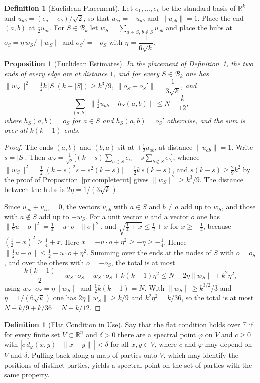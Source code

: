 \documentclass[11pt,letterpaper]{report}
\theoremstyle{plain}
\newtheorem{proposition}[theorem]{Proposition}
\theoremstyle{definition}
\newtheorem{definition}[theorem]{Definition}
\theoremstyle{remark}
\begin{document}
\begin{definition}[Euclidean Placement]\label{def:placement}
Let $e_1,\ldots,e_k$ be the standard basis of $\mathbb R^k$ and $u_{ab}=(e_a-e_b)/\sqrt2$, so that $u_{ba}=-u_{ab}$ and $\|u_{ab}\|=1$. Place the end $(a,b)$ at $\tfrac12u_{ab}$. For $S\in\mathcal B_k$ let $w_S=\sum_{a\in S,\,b\notin S}u_{ab}$ and place the hubs at $o_S=\eta\,w_S/\|w_S\|$ and $o_S'=-o_S$ with $\eta=\dfrac1{6\sqrt k}$.
\end{definition}

\begin{proposition}[Euclidean Estimates]\label{pr:euclid}
In the placement of Definition~\ref{def:placement}, the two ends of every edge are at distance $1$, and for every $S\in\mathcal B_k$ one has $\|w_S\|^2=\tfrac12k\,|S|(k-|S|)\ge k^3/9$, $\|o_S-o_S'\|=\dfrac1{3\sqrt k}$, and
\[
\sum_{(a,b)}\bigl\|\tfrac12u_{ab}-h_S(a,b)\bigr\|\le N-\frac k{12},
\]
where $h_S(a,b)=o_S$ for $a\in S$ and $h_S(a,b)=o_S'$ otherwise, and the sum is over all $k(k-1)$ ends.
\end{proposition}
\begin{proof}
The ends $(a,b)$ and $(b,a)$ sit at $\pm\tfrac12u_{ab}$, at distance $\|u_{ab}\|=1$. Write $s=|S|$. Then $w_S=\tfrac1{\sqrt2}\bigl[(k-s)\sum_{a\in S}e_a-s\sum_{b\notin S}e_b\bigr]$, whence $\|w_S\|^2=\tfrac12\bigl[(k-s)^2s+s^2(k-s)\bigr]=\tfrac12k\,s(k-s)$, and $s(k-s)\ge\tfrac29k^2$ by the proof of Proposition~\ref{pr:completecut} gives $\|w_S\|^2\ge k^3/9$. The distance between the hubs is $2\eta=1/(3\sqrt k)$.

Since $u_{ab}+u_{ba}=0$, the vectors $u_{ab}$ with $a\in S$ and $b\ne a$ add up to $w_S$, and those with $a\notin S$ add up to $-w_S$. For a unit vector $u$ and a vector $o$ one has $\|\tfrac12u-o\|^2=\tfrac14-u\cdot o+\|o\|^2$, and $\sqrt{\tfrac14+x}\le\tfrac12+x$ for $x\ge-\tfrac14$, because $(\tfrac12+x)^2\ge\tfrac14+x$. Here $x=-u\cdot o+\eta^2\ge-\eta\ge-\tfrac14$. Hence $\|\tfrac12u-o\|\le\tfrac12-u\cdot o+\eta^2$. Summing over the ends at the nodes of $S$ with $o=o_S$, and over the others with $o=-o_S$, the total is at most
\[
\frac{k(k-1)}2-w_S\cdot o_S-w_S\cdot o_S+k(k-1)\eta^2\le N-2\eta\|w_S\|+k^2\eta^2,
\]
using $w_S\cdot o_S=\eta\|w_S\|$ and $\tfrac12k(k-1)=N$. With $\|w_S\|\ge k^{3/2}/3$ and $\eta=1/(6\sqrt k)$ one has $2\eta\|w_S\|\ge k/9$ and $k^2\eta^2=k/36$, so the total is at most $N-k/9+k/36=N-k/12$.
\end{proof}

\begin{definition}[Flat Condition in Use]
Say that the flat condition holds over $\mathbb F$ if for every finite set $V\subset\mathbb R^n$ and $\delta>0$ there are a spectral point $\varphi$ on $V$ and $c\ge0$ with $|c\,d_\varphi(x,y)-\|x-y\|\,|<\delta$ for all $x,y\in V$, where $c$ and $\varphi$ may depend on $V$ and $\delta$. Pulling back along a map of parties onto $V$, which may identify the positions of distinct parties, yields a spectral point on the set of parties with the same property.
\end{definition}
\end{document}

